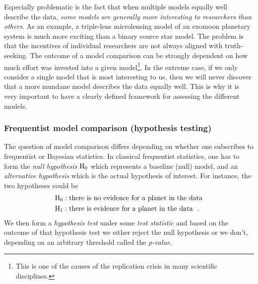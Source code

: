 \documentclass[12pt,dvipsnames]{report}
\newcommand{\hquad}{~~}
\begin{document}
Especially problematic is the fact that when multiple models equally well 
describe the data, \emph{some models are generally more interesting to researchers than others}.
As an example, a triple-lens microlensing model of an exomoon planetary system is much more 
exciting than a binary source star model. 
The problem is that the incentives of individual researchers 
are not always aligned with truth-seeking. The outcome of a model 
comparison can be strongly dependent on how much effort was invested into 
a given model\footnote{This is one of the causes of the replication crisis in 
many scientific disciplines.}. In the extreme case, if we only consider a single model that is 
most interesting to us, then we will never discover that a more mundane 
model describes the data equally well. 
This is why it is very important to have a clearly defined framework for assessing 
the different models.

\subsubsection{Frequentist model comparison (hypothesis testing)}
The question of model comparison differs depending on whether
one subscribes to frequentist or Bayesian statistics. In classical frequentist
statistics, one has to form the \emph{null hypothesis} $\textrm H_0$ which 
represents a baseline (null) model, and an \emph{alternative hypothesis} which is 
the actual hypothesis of interest. For instance, the two hypotheses could be
\begin{align}
    \textrm H_0: & \; \textrm{there is no evidence for a planet in the data} \notag\\
    \textrm H_1: & \;\textrm{there is evidence for a planet in the data}\notag
    \hquad.
\end{align}
We then form a \emph{hypothesis test} under some \emph{test statistic} 
and based on the outcome of that hypothesis test we either reject the null 
hypothesis or we don't, depending on an arbitrary threshold called the 
\emph{p-value}.
\end{document}
